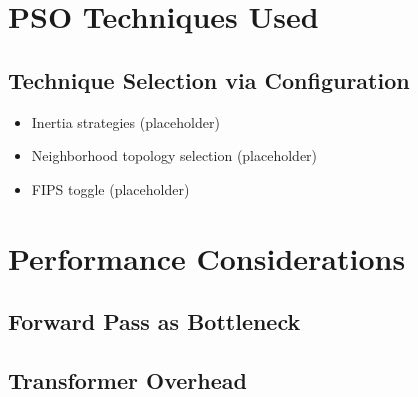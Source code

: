 \section{PSO Techniques Used}
\subsection{Technique Selection via Configuration}
\begin{itemize}
  \item Inertia strategies (placeholder)
  \item Neighborhood topology selection (placeholder)
  \item FIPS toggle (placeholder)
\end{itemize}

\section{Performance Considerations}
\subsection{Forward Pass as Bottleneck}

\subsection{Transformer Overhead}

